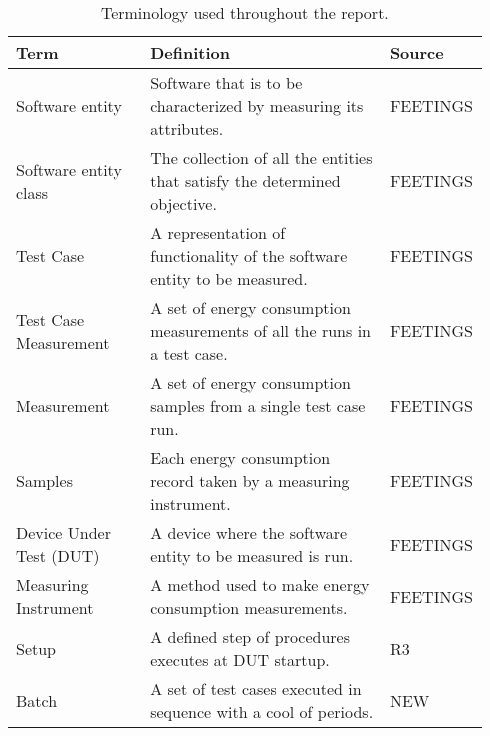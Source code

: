 
\begin{table}[ht]
    \begin{tabular}{| p{0.29\linewidth} | p{0.5\linewidth}| p{0.15\linewidth}|}
        \hline
        \textbf{Term}           & \textbf{Definition}                                                       & \textbf{Source} \\ \hline
        Software entity         & Software that is to be characterized by measuring its attributes.         & FEETINGS\cite{MANCEBO2021100558}        \\ \hline
        Software entity class   & The collection of all the entities that satisfy the determined objective. & FEETINGS\cite{MANCEBO2021100558}        \\ \hline
        Test Case               & A representation of functionality of the software entity to be measured.  & FEETINGS\cite{MANCEBO2021100558}         \\ \hline
        Test Case Measurement    & A set of energy consumption measurements of all the runs in a test case.  & FEETINGS\cite{MANCEBO2021100558}         \\ \hline
        Measurement             & A set of energy consumption samples from a single test case run.       & FEETINGS\cite{MANCEBO2021100558}         \\ \hline
        Samples                 & Each energy consumption record taken by a measuring instrument.           & FEETINGS\cite{MANCEBO2021100558}         \\ \hline
        Device Under Test (DUT) & A device where the software entity to be measured is run.                 & FEETINGS\cite{MANCEBO2021100558}         \\ \hline
        Measuring Instrument    & A method used to make energy consumption measurements.                    & FEETINGS\cite{MANCEBO2021100558}         \\ \hline
        Setup                   & A defined step of procedures executes at DUT startup.                     & R3\cite{Bokhari2020r3}              \\ \hline
        Batch                   & A set of test cases executed in sequence with a cool of periods.            & NEW             \\ \hline
    
    \end{tabular}
    \caption{Terminology used throughout the report.}
    \label{tab:feetTable}
    \end{table}